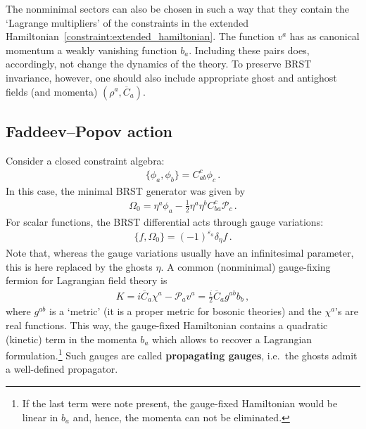     The nonminimal sectors can also be chosen in such a way that they contain the `Lagrange multipliers' of the constraints in the extended Hamiltonian~\eqref{constraint:extended_hamiltonian}. The function $v^a$ has as canonical momentum a weakly vanishing function $b_a$. Including these pairs does, accordingly, not change the dynamics of the theory. To preserve BRST invariance, however, one should also include appropriate ghost and antighost fields (and momenta) $(\rho^a,\overline{C}_a)$.

\subsection{Faddeev--Popov action}

    Consider a closed constraint algebra:
    \begin{gather}
        \{\phi_a,\phi_b\}=C^c_{ab}\phi_c\,.
    \end{gather}
    In this case, the minimal BRST generator was given by
    \begin{gather}
        \Omega_0 = \eta^a\phi_a - \frac{1}{2}\eta^a\eta^b C^c_{ba}\mathcal{P}_c\,.
    \end{gather}
    For scalar functions, the BRST differential acts through gauge variations:
    \begin{gather}
        \{f,\Omega_0\} = (-1)^{\varepsilon_a}\delta_\eta f\,.
    \end{gather}
    Note that, whereas the gauge variations usually have an infinitesimal parameter, this is here replaced by the ghosts $\eta$. A common (nonminimal) gauge-fixing fermion for Lagrangian field theory is
    \begin{gather}
        K = i\overline{C}_a\chi^a - \mathcal{P}_av^a = \frac{i}{2}\overline{C}_ag^{ab}b_b\,,
    \end{gather}
    where $g^{ab}$ is a `metric' (it is a proper metric for bosonic theories) and the $\chi^a$'s are real functions. This way, the gauge-fixed Hamiltonian contains a quadratic (kinetic) term in the momenta $b_a$ which allows to recover a Lagrangian formulation.\footnote{If the last term were note present, the gauge-fixed Hamiltonian would be linear in $b_a$ and, hence, the momenta can not be eliminated.} Such gauges are called \textbf{propagating gauges}, i.e.~the ghosts admit a well-defined propagator.

